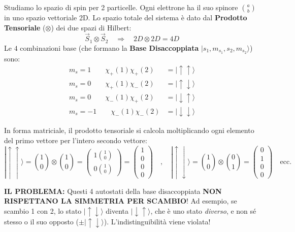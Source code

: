 \documentclass[11pt, a4paper]{article}
\begin{document}
Studiamo lo spazio di spin per 2 particelle. Ogni elettrone ha il suo spinore $\binom{a}{b}$ in uno spazio vettoriale 2D. Lo spazio totale del sistema è dato dal \textbf{Prodotto Tensoriale} ($\otimes$) dei due spazi di Hilbert: %
\begin{equation*}
    \vec{S}_1 \otimes \vec{S}_2 \quad \Rightarrow \quad 2D \otimes 2D = 4D %
\end{equation*}
Le $4$ combinazioni base (che formano la \textbf{Base Disaccoppiata} $|s_1, m_{s_1}, s_2, m_{s_2}\rangle$) sono: %
\begin{align*}
    m_s=1 \qquad\chi_+(1)\chi_+(2) &= |\uparrow\uparrow\rangle \\ %
    m_s=0 \qquad\chi_+(1)\chi_-(2) &= |\uparrow\downarrow\rangle \\ %
    m_s=0 \qquad\chi_-(1)\chi_+(2) &= |\downarrow\uparrow\rangle \\ %
    m_s=-1 \qquad\chi_-(1)\chi_-(2) &= |\downarrow\downarrow\rangle %
\end{align*}

\noindent
In forma matriciale, il prodotto tensoriale si calcola moltiplicando ogni elemento del primo vettore per l'intero secondo vettore: %
\begin{equation*}
    |\uparrow\uparrow\rangle = \binom{1}{0} \otimes \binom{1}{0} = \begin{pmatrix} 1 \binom{1}{0} \\ 0 \binom{1}{0} \end{pmatrix} = \begin{pmatrix} 1 \\ 0 \\ 0 \\ 0 \end{pmatrix} \quad , \quad |\uparrow\downarrow\rangle = \binom{1}{0} \otimes \binom{0}{1} = \begin{pmatrix} 0 \\ 1 \\ 0 \\ 0 \end{pmatrix} \quad \text{ecc.} %
\end{equation*}

\noindent
\textbf{IL PROBLEMA:} Questi 4 autostati della base disaccoppiata \textbf{NON RISPETTANO LA SIMMETRIA PER SCAMBIO}! Ad esempio, se scambio 1 con 2, lo stato $|\uparrow\downarrow\rangle$ diventa $|\downarrow\uparrow\rangle$, che è uno stato \textit{diverso}, e non sé stesso o il suo opposto ($\pm |\uparrow\downarrow\rangle$). L'indistinguibilità viene violata! %
\end{document}
